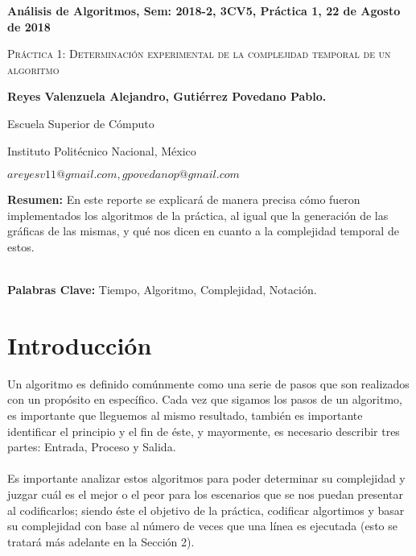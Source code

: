 \documentclass[12pt,twoside]{article}
\date{}
\begin{document}
\centerline{\bf An\'alisis de Algoritmos, Sem: 2018-2, 3CV5, Pr\'actica 1, 22 de Agosto de 2018}
\centerline{}
\centerline{}
\begin{center}
\Large{\textsc{Pr\'actica 1: Determinaci\'on experimental de la complejidad temporal de un
algoritmo}}
\end{center}
\centerline{}
\centerline{\bf {Reyes Valenzuela Alejandro, Guti\'errez Povedano Pablo.}}
\centerline{}
\centerline{Escuela Superior de C\'omputo}
\centerline{Instituto Polit\'ecnico Nacional, M\'exico}
\centerline{$areyesv11@gmail.com, gpovedanop@gmail.com$}
\newtheorem{Theorem}{\quad Theorem}[section]
\newtheorem{Definition}[Theorem]{\quad Definition}
\newtheorem{Corollary}[Theorem]{\quad Corollary}
\newtheorem{Lemma}[Theorem]{\quad Lemma}
\newtheorem{Example}[Theorem]{\quad Example}
\bigskip
\textbf{Resumen:} En este reporte se explicar\'a de manera precisa c\'omo fueron implementados los algoritmos de la pr\'actica, al igual que la generaci\'on de las gr\'aficas de las mismas, y qu\'e nos dicen en cuanto a la complejidad temporal de estos.\\\\
\centerline{{\bf Palabras Clave:} Tiempo, Algoritmo, Complejidad, Notaci\'on.}
\section{Introducci\'on}
Un algoritmo es definido com\'unmente como una serie de pasos que son realizados con un prop\'osito en espec\'ifico. Cada vez que sigamos los pasos de un algoritmo, es importante que lleguemos al mismo resultado, tambi\'en es importante identificar el principio y el fin de \'este, y mayormente, es necesario describir tres partes: Entrada, Proceso y Salida. \\\\
Es importante analizar estos algoritmos para poder determinar su complejidad y juzgar cu\'al es el mejor o el peor para los escenarios que se nos puedan presentar al codificarlos; siendo \'este el objetivo de la pr\'actica, codificar algortimos y basar su complejidad con base al n\'umero de veces que una l\'inea es ejecutada (esto se tratar\'a m\'as adelante en la Secci\'on 2).
\end{document}

